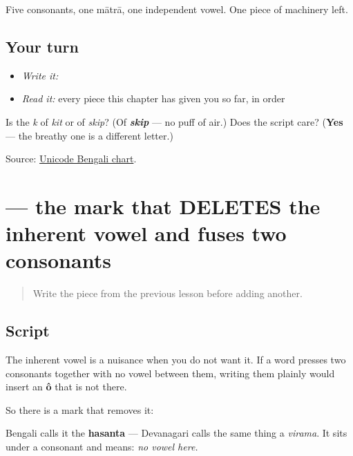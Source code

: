 Five consonants, one mātrā, one independent vowel. One piece of machinery left.

\subsection*{Your turn}
\begin{itemize}
\raggedright
  \item \emph{Write it:} 
  \item \emph{Read it:} every piece this chapter has given you so far, in order
\end{itemize}

\begin{tcolorbox}[breakable,colback=teal!4,colframe=teal!35!black,title={Before you move on}]
Is \textbf{} the \emph{k} of \emph{kit} or of \emph{skip}? (Of \emph{\textbf{skip}} — no puff of air.) Does the script care? (\textbf{Yes} — the breathy one is a different letter.)

Source: \href{https://www.unicode.org/charts/PDF/U0980.pdf}{Unicode Bengali chart}.
\end{tcolorbox}
\section[(hasanta)]{ — the mark that DELETES the inherent vowel and fuses two consonants}

\label{lesson:BN-W01-hasanta}



\begin{quote}
Write the piece from the previous lesson before adding another.
\end{quote}

\subsection*{Script}
The inherent vowel is a nuisance when you do not want it. If a word presses two consonants together with no vowel between them, writing them plainly would insert an \textbf{ô} that is not there.

So there is a mark that removes it:

\begin{quote}
\end{quote}

Bengali calls it the \textbf{hasanta} — Devanagari calls the same thing a \emph{virama}. It sits under a consonant and means: \emph{no vowel here.}

